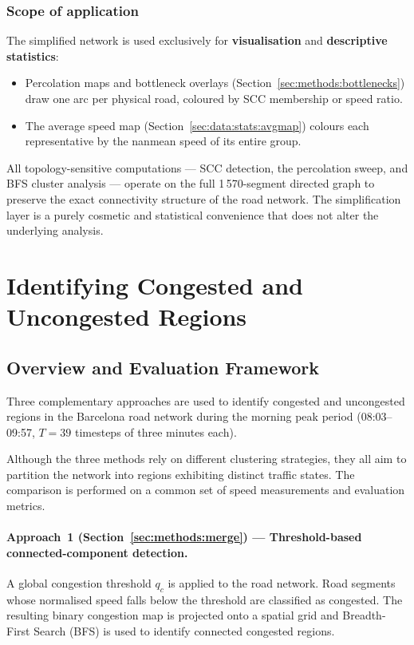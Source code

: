 \documentclass[11pt,a4paper]{article}
\begin{document}
\subsubsection*{Scope of application}

The simplified network is used exclusively for \textbf{visualisation} and
\textbf{descriptive statistics}:
\begin{itemize}
  \item Percolation maps and bottleneck overlays
    (Section~\ref{sec:methods:bottlenecks}) draw one arc per physical road,
    coloured by SCC membership or speed ratio.
  \item The average speed map (Section~\ref{sec:data:stats:avgmap}) colours
    each representative by the nanmean speed of its entire group.
\end{itemize}
All topology-sensitive computations --- SCC detection, the percolation sweep,
and BFS cluster analysis --- operate on the full 1\,570-segment directed graph
to preserve the exact connectivity structure of the road network.  The
simplification layer is a purely cosmetic and statistical convenience that
does not alter the underlying analysis.

\section{Identifying Congested and Uncongested Regions}
\label{sec:methods}

\subsection{Overview and Evaluation Framework}
\label{sec:methods:overview}

Three complementary approaches are used to identify congested and
uncongested regions in the Barcelona road network during the morning peak
period (08:03--09:57, $T = 39$ timesteps of three minutes each).

Although the three methods rely on different clustering strategies, they all
aim to partition the network into regions exhibiting distinct traffic states.
The comparison is performed on a common set of speed measurements and
evaluation metrics.

\paragraph{Approach~1 (Section~\ref{sec:methods:merge}) --- Threshold-based
connected-component detection.}
A global congestion threshold $q_c$ is applied to the road network.
Road segments whose normalised speed falls below the threshold are classified
as congested. The resulting binary congestion map is projected onto a spatial
grid and Breadth-First Search (BFS) is used to identify connected congested
regions.
\end{document}
